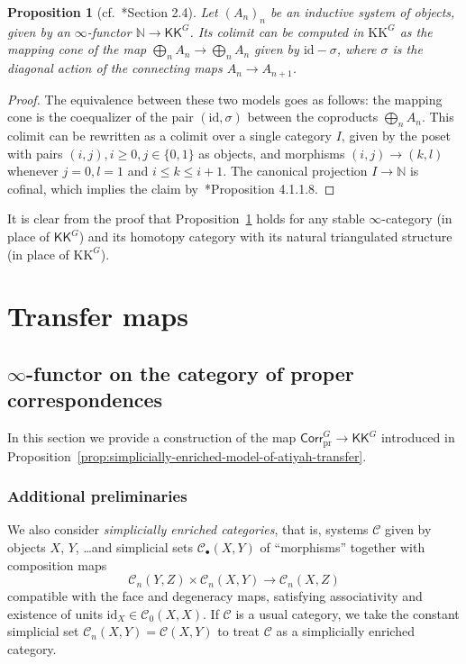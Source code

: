 \documentclass[a4paper,reqno]{amsart}
\theoremstyle{plain}
\newtheorem{proposition}[theorem]{Proposition}
\theoremstyle{definition}
\theoremstyle{remark}
\numberwithin{equation}{section}
\newcommand{\cC}{\mathcal{C}}
\newcommand{\dN}{\mathbb{N}}
\newcommand{\PrCorr}{\mathsf{Corr}_{\mathrm{pr}}}
\newcommand{\id}{\mathrm{id}}
\newcommand{\KK}{\mathrm{KK}}
\newcommand{\icKK}{\mathsf{KK}}
\begin{document}
\begin{proposition}[cf.~\cite{nestmeyer:loc}*{Section 2.4}]\label{prop:indinfcolim}
Let $(A_n)_n$ be an inductive system of objects, given by an $\infty$-functor $\dN \to \icKK^G$.
Its colimit can be computed in $\KK^G$ as the mapping cone of the map $\bigoplus_n A_n\to\bigoplus_n A_n$ given by $\id-\sigma$, where $\sigma$ is the diagonal action of the connecting maps $A_n \to A_{n + 1}$.
\end{proposition}

\begin{proof}
The equivalence between these two models goes as follows: the mapping cone is the coequalizer of the pair $(\id,\sigma)$ between the coproducts $\bigoplus_n A_n$.
This colimit can be rewritten as a colimit over a single category $I$, given by the poset with pairs $(i,j), i\geq 0, j\in\{0,1\}$ as objects, and morphisms $(i,j)\to (k,l)$ whenever $j=0,l=1$ and $i\leq k \leq i+1$.
The canonical projection $I\to \dN$ is cofinal, which implies the claim by~\cite{lur:ht}*{Proposition 4.1.1.8}.
\end{proof}

It is clear from the proof that Proposition~\ref{prop:indinfcolim} holds for any stable $\infty$-category (in place of $\icKK^G$) and its homotopy category with its natural triangulated structure (in place of $\KK^G$).

\section{Transfer maps}\label{sec:transfer-maps}

\subsection{\texorpdfstring{$\infty$}{Infinity}-functor on the category of proper correspondences}\label{app:alt-proof}

In this section we provide a construction of the map $\PrCorr^G \to \icKK^G$ introduced in Proposition~\ref{prop:simplicially-enriched-model-of-atiyah-transfer}.

\subsubsection{Additional preliminaries}

We also consider \emph{simplicially enriched categories}, that is, systems $\cC$ given by objects $X$, $Y$, \dots and simplicial sets $\cC_\bullet(X, Y)$ of ``morphisms'' together with composition maps
\[
\cC_n(Y, Z) \times \cC_n(X, Y) \to \cC_n(X, Z)
\]
compatible with the face and degeneracy maps, satisfying associativity and existence of units $\id_X \in \cC_0(X, X)$. If $\cC$ is a usual category, we take the constant simplicial set $\cC_n(X, Y) = \cC(X, Y)$ to treat $\cC$ as a simplicially enriched category.
\end{document}
